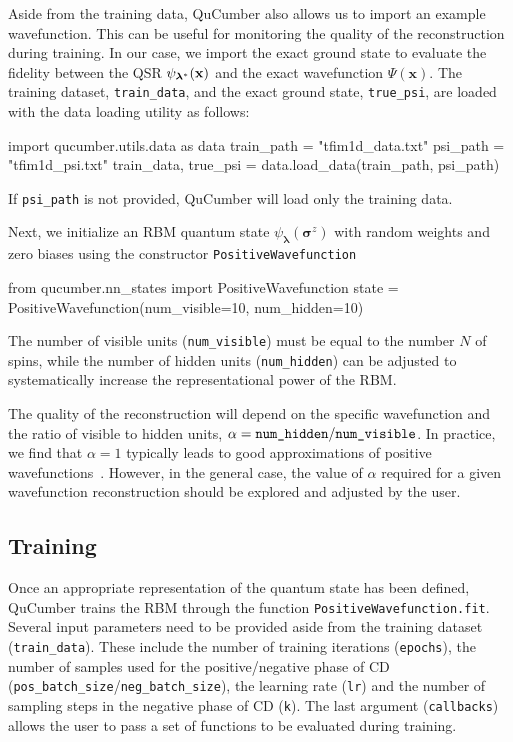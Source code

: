 \documentclass[submission, Phys, hidelnks]{SciPost}
\begin{document}
Aside from the training data, QuCumber also allows us to import an example wavefunction. This can be useful for monitoring the quality of the reconstruction during training. In our case, we import the exact ground state to evaluate the fidelity between the QSR $\psi_{\bm{\lambda}^*}(\bf{x})$ and the exact wavefunction $\Psi(\bm{x})$.
The training dataset, \verb|train_data|, and the exact ground state, \verb|true_psi|, are loaded with the data loading utility as follows:
\begin{python}
import qucumber.utils.data as data
train_path = "tfim1d_data.txt"
psi_path = "tfim1d_psi.txt"
train_data, true_psi = data.load_data(train_path, psi_path)
\end{python}
If \verb|psi_path| is not provided, QuCumber will load only the training data. 

Next, we initialize an RBM quantum state $\psi_{\bm{\lambda}}(\bm{\sigma}^z)$ with random weights and zero biases using the constructor \verb|PositiveWavefunction|
\begin{python}
from qucumber.nn_states import PositiveWavefunction
state = PositiveWavefunction(num_visible=10, num_hidden=10)
\end{python}
The number of visible units (\verb|num_visible|) must be equal to the number $N$ of spins, while the number of hidden units (\verb|num_hidden|) can be adjusted to systematically increase the representational power of the RBM. 

The quality of the reconstruction will depend on the specific wavefunction and the ratio of visible to hidden units, $\alpha = \verb|num_hidden|/\verb|num_visible|$.
In practice, we find that $\alpha = 1$ typically leads to good approximations of positive wavefunctions~\cite{Torlai2016thermo}. However, in the general case, the value of $\alpha$ required for a given wavefunction reconstruction should be explored and adjusted by the user.


\subsection{Training}
Once an appropriate representation of the quantum state has been defined, QuCumber trains the RBM through the function \verb|PositiveWavefunction.fit|. Several input parameters need to be provided aside from the training dataset (\verb|train_data|). These include the number of training iterations (\verb|epochs|), the number of samples used for the positive/negative phase of CD (\verb|pos_batch_size|/\verb|neg_batch_size|), the learning rate (\verb|lr|) and the number of sampling steps in the negative phase of CD (\verb|k|). The last argument (\verb|callbacks|) allows the user to pass a set of functions to be evaluated during training.
\end{document}
